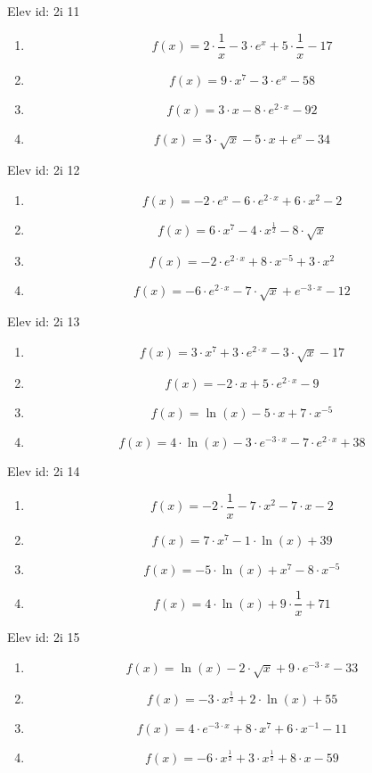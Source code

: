\item Elev id: 2i 11
\begin{enumerate}
\item 
$$
f(x)=2\cdot \frac{1}{x}-3\cdot e^x+5\cdot \frac{1}{x}-17
$$
\item 
$$
f(x)=9\cdot x^7-3\cdot e^x-58
$$
\item 
$$
f(x)=3\cdot x-8\cdot e^{2\cdot x}-92
$$
\item 
$$
f(x)=3\cdot \sqrt{x}-5\cdot x+e^x-34
$$
\end{enumerate}
\item Elev id: 2i 12
\begin{enumerate}
\item 
$$
f(x)=-2\cdot e^x-6\cdot e^{2\cdot x}+6\cdot x^2-2
$$
\item 
$$
f(x)=6\cdot x^7-4\cdot x^{\frac{1}{2}}-8\cdot \sqrt{x}
$$
\item 
$$
f(x)=-2\cdot e^{2\cdot x}+8\cdot x^{-5}+3\cdot x^2
$$
\item 
$$
f(x)=-6\cdot e^{2\cdot x}-7\cdot \sqrt{x}+e^{-3\cdot x}-12
$$
\end{enumerate}
\item Elev id: 2i 13
\begin{enumerate}
\item 
$$
f(x)=3\cdot x^7+3\cdot e^{2\cdot x}-3\cdot \sqrt{x}-17
$$
\item 
$$
f(x)=-2\cdot x+5\cdot e^{2\cdot x}-9
$$
\item 
$$
f(x)=\ln(x)-5\cdot x+7\cdot x^{-5}
$$
\item 
$$
f(x)=4\cdot \ln(x)-3\cdot e^{-3\cdot x}-7\cdot e^{2\cdot x}+38
$$
\end{enumerate}
\item Elev id: 2i 14
\begin{enumerate}
\item 
$$
f(x)=-2\cdot \frac{1}{x}-7\cdot x^2-7\cdot x-2
$$
\item 
$$
f(x)=7\cdot x^7-1\cdot \ln(x)+39
$$
\item 
$$
f(x)=-5\cdot \ln(x)+x^7-8\cdot x^{-5}
$$
\item 
$$
f(x)=4\cdot \ln(x)+9\cdot \frac{1}{x}+71
$$
\end{enumerate}
\item Elev id: 2i 15
\begin{enumerate}
\item 
$$
f(x)=\ln(x)-2\cdot \sqrt{x}+9\cdot e^{-3\cdot x}-33
$$
\item 
$$
f(x)=-3\cdot x^{\frac{1}{2}}+2\cdot \ln(x)+55
$$
\item 
$$
f(x)=4\cdot e^{-3\cdot x}+8\cdot x^7+6\cdot x^{-1}-11
$$
\item 
$$
f(x)=-6\cdot x^{\frac{1}{2}}+3\cdot x^{\frac{1}{2}}+8\cdot x-59
$$
\end{enumerate}
